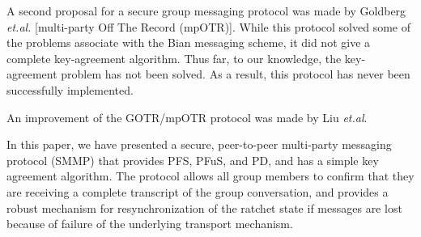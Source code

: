 \documentclass[%
preprint,
amsmath,amssymb,
aps,
prb,
floatfix,
]{revtex4-1}
\begin{document}
A second proposal for a secure group messaging protocol was made by Goldberg
\textit{et.al.}\cite{ref:goldberg} [multi-party Off The Record (mpOTR)].
While this protocol solved some of the
problems associate with the Bian messaging scheme, it did not give a complete
key-agreement algorithm. Thus far, to our knowledge, the key-agreement problem
has not been solved. As a result, this protocol has never been successfully
implemented.

An improvement of the GOTR/mpOTR protocol was made by Liu
\textit{et.al}\cite{ref:liu}.

In this paper, we have presented a secure, peer-to-peer multi-party messaging protocol
(SMMP) that provides PFS, PFuS, and PD, and has a simple key agreement
algorithm. The protocol allows all group members to confirm that they are
receiving a complete transcript of the group conversation, and provides a
robust mechanism for resynchronization of the ratchet state if messages are lost
because of failure of the underlying transport mechanism.
\end{document}
